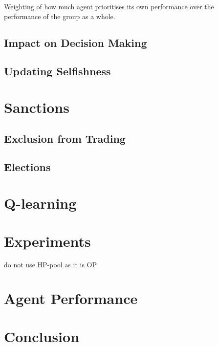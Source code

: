 Weighting of how much agent prioritises its own performance over the performance of the group as a whole.

\subsection{Impact on Decision Making}

\subsection{Updating Selfishness}


\section{Sanctions}

\subsection{Exclusion from Trading}

\subsection{Elections}

\section{Q-learning}

\section{Experiments}
do not use HP-pool as it is OP

\section{Agent Performance}

\section{Conclusion}